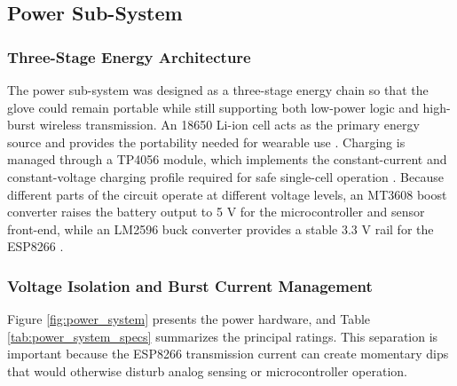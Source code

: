 \documentclass[12pt,a4paper]{report}
\begin{document}
\subsection{Power Sub-System}
\label{sec:hw_power}

\subsubsection{Three-Stage Energy Architecture}
The power sub-system was designed as a three-stage energy chain so that the glove could remain portable while still supporting both low-power logic and high-burst wireless transmission. An 18650 Li-ion cell acts as the primary energy source and provides the portability needed for wearable use \cite{battery18650}. Charging is managed through a TP4056 module, which implements the constant-current and constant-voltage charging profile required for safe single-cell operation \cite{tp4056}. Because different parts of the circuit operate at different voltage levels, an MT3608 boost converter raises the battery output to 5 V for the microcontroller and sensor front-end, while an LM2596 buck converter provides a stable 3.3 V rail for the ESP8266 \cite{mt3608,lm2596}.

\subsubsection{Voltage Isolation and Burst Current Management}
Figure \ref{fig:power_system} presents the power hardware, and Table \ref{tab:power_system_specs} summarizes the principal ratings. This separation is important because the ESP8266 transmission current can create momentary dips that would otherwise disturb analog sensing or microcontroller operation.
\end{document}
